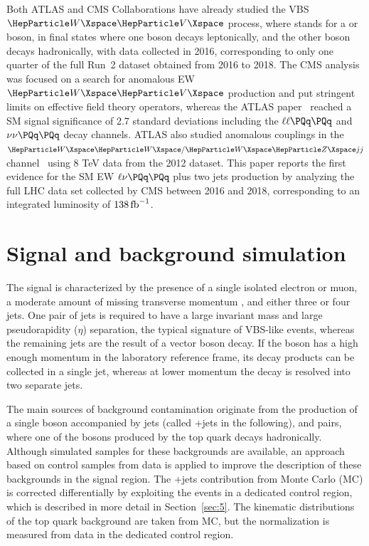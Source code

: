 Both ATLAS and CMS Collaborations have already studied the VBS $\PW\PV$ process, where {\PV} stands for a {\PW} or {\PZ}
boson, in final states where one boson decays leptonically, and the other boson decays hadronically, with data collected
in 2016, corresponding to only one quarter of the full Run~2 dataset obtained from 2016 to 2018.  The CMS
analysis~\cite{Sirunyan:2019der} was focused on a search for anomalous EW $\PW\PV$ production and put stringent limits
on effective field theory operators, whereas the ATLAS paper~\cite{Aad:2019xxo} reached a SM signal significance of 2.7
standard deviations including the $\ell\ell\PQq\PQq$ and $\nu\nu\PQq\PQq$ decay channels. ATLAS also studied
anomalous couplings in the $\PW\PW/\PW\PZ jj$ channel~\cite{ATLAS:2016nmw} using 8 TeV data from the 2012 dataset.
This paper reports the first evidence for the SM EW $\ell\nu\PQq\PQq$
plus two jets production by analyzing the full LHC
data set collected by CMS between 2016 and 2018, corresponding to an
integrated luminosity of $138\mbox{\ensuremath{\,\text{fb}^{-1}}}$.

\section{Signal and background simulation}\label{sec:2}

The signal is characterized by the presence of a single isolated electron or muon, a moderate amount of missing
transverse momentum \ptmiss, and either three or four jets.  One pair of jets is required to have a large invariant mass
and large pseudorapidity ($\eta$) separation, the typical signature of VBS-like events, whereas the remaining jets are
the result of a vector boson decay.  If the boson has a high enough momentum in the laboratory reference frame, its
decay products can be collected in a single jet, whereas at lower momentum the decay is resolved into two separate jets.

The main sources of background contamination originate from the production of a single {\PW} boson accompanied by jets
(called {\PW}+jets in the following), and \ttbar pairs, where one of the {\PW} bosons produced by the top quark decays
hadronically.  Although simulated samples for these backgrounds are available, an approach based on control samples from
data is applied to improve the description of these backgrounds in the signal region.  The {\PW}+jets contribution from
Monte Carlo (MC) is corrected differentially by exploiting the events in a dedicated control region, which is described
in more detail in Section~\ref{sec:5}. The kinematic distributions of the top quark background are taken
from MC, but the normalization is measured from data in the dedicated control region.

